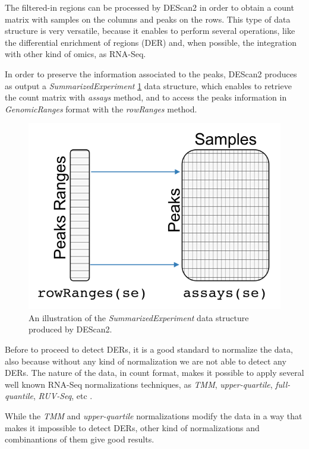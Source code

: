 The filtered-in regions can be processed by DEScan2 in order to obtain a count matrix with samples on the columns and peaks on the rows.
This type of data structure is very versatile, because it enables to perform several operations, like the differential enrichment of regions (DER) and, when possible, the integration with other kind of omics, as RNA-Seq.

In order to preserve the information associated to the peaks, DEScan2 produces as output a \textit{SummarizedExperiment} \ref{fig:countsdescan} data structure, which enables to retrieve the count matrix with \textit{assays} method, and to access the peaks information in \textit{GenomicRanges} format with the \textit{rowRanges} method.

\begin{figure}[H]
\centering
\includegraphics[keepaspectratio]{img/descan2/counts.png}
\caption[DEScan2 counts illustration]{An illustration of the \textit{SummarizedExperiment} data structure produced by DEScan2.}
\label{fig:countsdescan}
\centering
\end{figure}

Before to proceed to detect DERs, it is a good standard to normalize the data, also because without any kind of normalization we are not able to detect any DERs.
The nature of the data, in count format, makes it possible to apply several well known RNA-Seq normalizations techniques, as \textit{TMM}, \textit{upper-quartile}, \textit{full-quantile}, \textit{RUV-Seq}, etc \cite{Risso2014, Robinson2010, Dillies2013}.

While the \textit{TMM} and \textit{upper-quartile} normalizations modify the data in a way that makes it impossible to detect DERs, other kind of normalizations and combinantions of them give good results.

